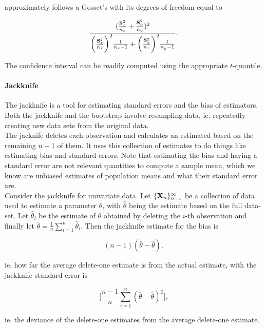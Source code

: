 \documentclass{homework}
\begin{document}
approximately follows a Gosset's \tdis with its degrees of freedom equal to 

$$
\frac{(\frac{{\bf S}_x^2}{n_x}+\frac{{\bf S}_y^2}{n_y})^2}{\bigg(\frac{{\bf S}_x^2}{n_x}\bigg)^2 \frac{1}{n_x-1}+\bigg(\frac{{\bf S}_y^2}{n_x}\bigg)^2 \frac{1}{n_y-1}}.
$$

The confidence interval can be readily computed using the appropriate $t$-quantile. \\

\paragraph{\textbf{Jackknife}}

The jackknife is a tool for estimating standard errors and the bias of estimators. Both the jackknife and the bootstrap involve resampling data, ie. repeatedly creating new data sets from the original data. \\

The jacknife deletes each observation and calculates an estimated based on the remaining $n-1$ of them. It uses this collection of estimates to do things like estimating bias and standard errors. Note that estimating the bias and having a standard error are not relevant quantities to compute a sample mean, which we know are unbiased estimates of population means and what their standard error are. \\

Consider the jackknife for univariate data. Let $\{{\bf X}_n\}_{n=1}^{\infty}$ be a collection of data used to estimate a parameter $\theta$, with $\hat{\theta}$ being the estimate based on the full data-set. Let $\hat{\theta}_i$ be the estimate of $\theta$ obtained by deleting the $i$-th observation and finally let $\bar{\theta}=\frac{1}{n}\sum_{i=1}^{n} \hat{\theta}_i$. Then the jackknife estimate for the bias is 

$$
(n-1)(\bar{\theta}-\hat{\theta}),
$$

ie. how far the average delete-one estimate is from the actual estimate, with the jackknife standard error is 

$$
\bigg[\frac{n-1}{n}\sum_{i=1}^{n} (\bar{\theta}-\hat{\theta})^{\frac{1}{2}}\bigg],
$$

ie. the deviance of the delete-one estimates from the average delete-one estimate. 
\end{document}
